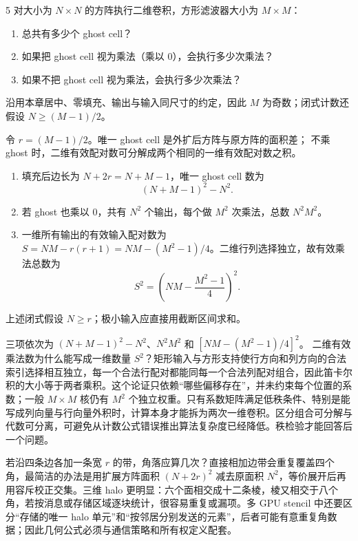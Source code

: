 \begin{solutionexercise}{5}
\problemheading 对大小为 $N\times N$ 的方阵执行二维卷积，方形滤波器大小为 $M\times M$：
\begin{enumerate}[label=\alph*.,leftmargin=2.2em]
  \item 总共有多少个 ghost cell？
  \item 如果把 ghost cell 视为乘法（乘以 0），会执行多少次乘法？
  \item 如果不把 ghost cell 视为乘法，会执行多少次乘法？
\end{enumerate}
沿用本章居中、零填充、输出与输入同尺寸的约定，因此 $M$ 为奇数；闭式计数还假设
$N\ge (M-1)/2$。

\approachheading 令 $r=(M-1)/2$。唯一 ghost cell 是外扩后方阵与原方阵的面积差；
不乘 ghost 时，二维有效配对数可分解成两个相同的一维有效配对数之积。

\answerheading
\begin{enumerate}[label=\alph*.,leftmargin=2.2em]
\item 填充后边长为 $N+2r=N+M-1$，唯一 ghost cell 数为
\[
 (N+M-1)^2-N^2.
\]
\item 若 ghost 也乘以 0，共有 $N^2$ 个输出，每个做 $M^2$ 次乘法，总数
$N^2M^2$。
\item 一维所有输出的有效输入配对数为
$S=NM-r(r+1)=NM-(M^2-1)/4$。二维行列选择独立，故有效乘法总数为
\[
 S^2=\left(NM-\frac{M^2-1}{4}\right)^2.
\]
\end{enumerate}
上述闭式假设 $N\ge r$；极小输入应直接用截断区间求和。

\conclusionheading 三项依次为 $(N+M-1)^2-N^2$、$N^2M^2$ 和
$[NM-(M^2-1)/4]^2$。
\discussionheading
{}
二维有效乘法数为什么能写成一维数量 $S^2$？矩形输入与方形支持使行方向和列方向的合法索引选择相互独立，每一个合法行配对都能同每一个合法列配对组合，因此笛卡尔积的大小等于两者乘积。这个论证只依赖“哪些偏移存在”，并未约束每个位置的系数；一般 $M\times M$ 核仍有 $M^2$ 个独立权重。只有系数矩阵满足低秩条件、特别是能写成列向量与行向量外积时，计算本身才能拆为两次一维卷积。区分组合可分解与代数可分离，可避免从计数公式错误推出算法复杂度已经降低。秩检验才能回答后一个问题。

若沿四条边各加一条宽 $r$ 的带，角落应算几次？直接相加边带会重复覆盖四个角，最简洁的办法是用扩展方阵面积 $(N+2r)^2$ 减去原面积 $N^2$，等价展开后再用容斥校正交集。三维 halo 更明显：六个面相交成十二条棱，棱又相交于八个角，若按消息或存储区域逐块统计，很容易重复或漏项。多 GPU stencil 中还要区分“存储的唯一 halo 单元”和“按邻居分别发送的元素”，后者可能有意重复角数据；因此几何公式必须与通信策略和所有权定义配套。


\end{solutionexercise}

